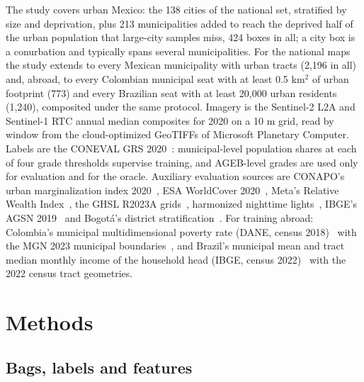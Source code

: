 \documentclass[11pt]{article}
\begin{document}
The study covers urban Mexico: the 138 cities of the national set, stratified by size and
deprivation, plus 213 municipalities added to reach the deprived half of the urban
population that large-city samples miss, 424 boxes in all; a city box is a conurbation
and typically spans several municipalities. For the national maps the study extends to
every Mexican municipality with urban tracts (2{,}196 in all) and, abroad, to every
Colombian municipal seat with at least 0.5 km$^2$ of urban footprint (773) and every
Brazilian seat with at least 20{,}000 urban residents (1{,}240), composited under the
same protocol. Imagery is the Sentinel-2 L2A and Sentinel-1
RTC annual median composites for 2020 on a 10 m grid, read by window from the
cloud-optimized GeoTIFFs of Microsoft Planetary Computer. Labels are the CONEVAL GRS
2020~\cite{coneval2020}: municipal-level population shares at each of four grade
thresholds supervise training, and AGEB-level grades are used only for evaluation and
for the oracle. Auxiliary evaluation sources are CONAPO's urban marginalization index
2020~\cite{conapo2020}, ESA WorldCover 2020~\cite{worldcover}, Meta's Relative Wealth
Index~\cite{chi2022}, the GHSL R2023A grids~\cite{ghsl2023}, harmonized nighttime
lights~\cite{li2020}, IBGE's AGSN 2019~\cite{ibge2019} and Bogot\'a's district
stratification~\cite{bogota}. For training abroad: Colombia's municipal
multidimensional poverty rate (DANE, census 2018)~\cite{dane_ipm} with the MGN 2023
municipal boundaries~\cite{mgn2023}, and Brazil's municipal mean and tract median
monthly income of the household head (IBGE, census 2022)~\cite{ibge2022} with the 2022
census tract geometries.

\section{Methods}

\subsection{Bags, labels and features}
\end{document}

